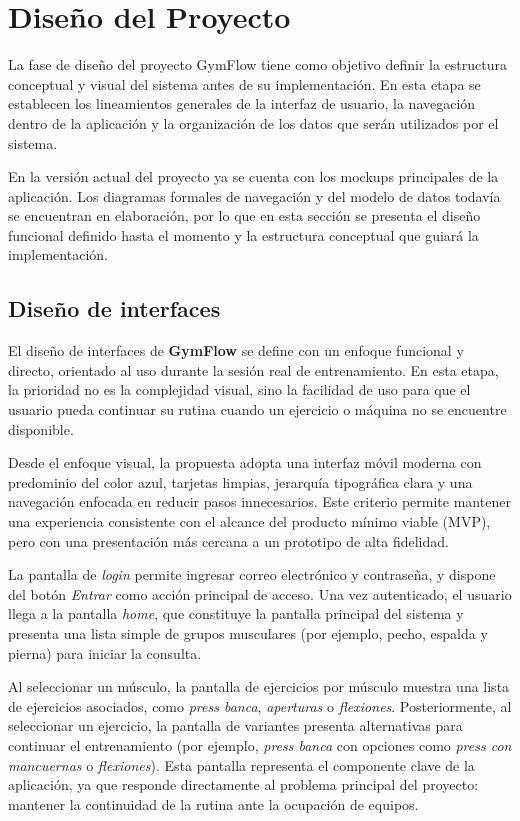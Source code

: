 \section{Diseño del Proyecto}

La fase de diseño del proyecto GymFlow tiene como objetivo definir la estructura conceptual y visual del sistema antes de su implementación. En esta etapa se establecen los lineamientos generales de la interfaz de usuario, la navegación dentro de la aplicación y la organización de los datos que serán utilizados por el sistema.

En la versión actual del proyecto ya se cuenta con los mockups principales de la aplicación. Los diagramas formales de navegación y del modelo de datos todavía se encuentran en elaboración, por lo que en esta sección se presenta el diseño funcional definido hasta el momento y la estructura conceptual que guiará la implementación.

\subsection{Diseño de interfaces}

El diseño de interfaces de \textbf{GymFlow} se define con un enfoque funcional y directo, orientado al uso durante la sesión real de entrenamiento. En esta etapa, la prioridad no es la complejidad visual, sino la facilidad de uso para que el usuario pueda continuar su rutina cuando un ejercicio o máquina no se encuentre disponible.

Desde el enfoque visual, la propuesta adopta una interfaz móvil moderna con predominio del color azul, tarjetas limpias, jerarquía tipográfica clara y una navegación enfocada en reducir pasos innecesarios. Este criterio permite mantener una experiencia consistente con el alcance del producto mínimo viable (MVP), pero con una presentación más cercana a un prototipo de alta fidelidad.

La pantalla de \textit{login} permite ingresar correo electrónico y contraseña, y dispone del botón \textit{Entrar} como acción principal de acceso. Una vez autenticado, el usuario llega a la pantalla \textit{home}, que constituye la pantalla principal del sistema y presenta una lista simple de grupos musculares (por ejemplo, pecho, espalda y pierna) para iniciar la consulta.

Al seleccionar un músculo, la pantalla de ejercicios por músculo muestra una lista de ejercicios asociados, como \textit{press banca}, \textit{aperturas} o \textit{flexiones}. Posteriormente, al seleccionar un ejercicio, la pantalla de variantes presenta alternativas para continuar el entrenamiento (por ejemplo, \textit{press banca} con opciones como \textit{press con mancuernas} o \textit{flexiones}). Esta pantalla representa el componente clave de la aplicación, ya que responde directamente al problema principal del proyecto: mantener la continuidad de la rutina ante la ocupación de equipos.

